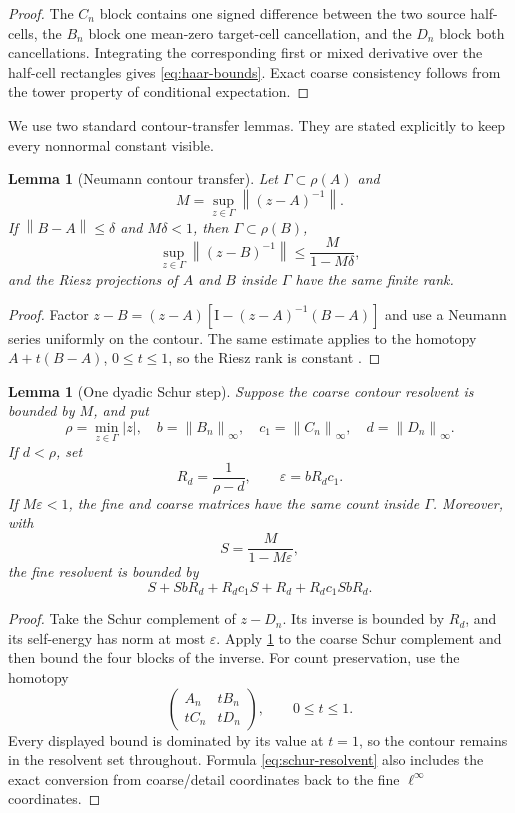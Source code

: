 \documentclass[11pt]{article}
\newtheorem{lemma}[theorem]{Lemma}
\theoremstyle{definition}
\theoremstyle{remark}
\newcommand{\Id}{\mathrm I}
\newcommand{\norm}[1]{\left\lVert #1\right\rVert}
\begin{document}
\begin{proof}
The $C_n$ block contains one signed difference between the two source
half-cells, the $B_n$ block one mean-zero target-cell cancellation, and the
$D_n$ block both cancellations.  Integrating the corresponding first or
mixed derivative over the half-cell rectangles gives
\eqref{eq:haar-bounds}.  Exact coarse consistency follows from the tower
property of conditional expectation.
\end{proof}

We use two standard contour-transfer lemmas.  They are stated explicitly to
keep every nonnormal constant visible.

\begin{lemma}[Neumann contour transfer]
\label{lem:neumann}
Let $\Gamma\subset\rho(A)$ and
\[
 M=\sup_{z\in\Gamma}\norm{(z-A)^{-1}}.
\]
If $\norm{B-A}\le\delta$ and $M\delta<1$, then
$\Gamma\subset\rho(B)$,
\[
 \sup_{z\in\Gamma}\norm{(z-B)^{-1}}
 \le\frac{M}{1-M\delta},
 \label{eq:neumann-resolvent}
\]
and the Riesz projections of $A$ and $B$ inside $\Gamma$ have the same
finite rank.
\end{lemma}

\begin{proof}
Factor $z-B=(z-A)[\Id-(z-A)^{-1}(B-A)]$ and use a Neumann series uniformly
on the contour.  The same estimate applies to the homotopy
$A+t(B-A)$, $0\le t\le1$, so the Riesz rank is constant
\citep{Kato1995}.
\end{proof}

\begin{lemma}[One dyadic Schur step]
\label{lem:schur}
Suppose the coarse contour resolvent is bounded by $M$, and put
\[
 \rho=\min_{z\in\Gamma}|z|,\quad
 b=\norm{B_n}_\infty,\quad
 c_1=\norm{C_n}_\infty,\quad
 d=\norm{D_n}_\infty.
\]
If $d<\rho$, set
\[
 R_d=\frac1{\rho-d},\qquad
 \varepsilon=bR_dc_1.
\]
If $M\varepsilon<1$, the fine and coarse matrices have the same count inside
$\Gamma$.  Moreover, with
\[
 S=\frac{M}{1-M\varepsilon},
\]
the fine resolvent is bounded by
\begin{equation}
 S+SbR_d+R_dc_1S+
 R_d+R_dc_1SbR_d.
 \label{eq:schur-resolvent}
\end{equation}
\end{lemma}

\begin{proof}
Take the Schur complement of $z-D_n$.  Its inverse is bounded by $R_d$,
and its self-energy has norm at most $\varepsilon$.  Apply
\cref{lem:neumann} to the coarse Schur complement and then bound the four
blocks of the inverse.  For count preservation, use the homotopy
\[
 \begin{pmatrix}A_n&tB_n\\tC_n&tD_n\end{pmatrix},
 \qquad0\le t\le1.
\]
Every displayed bound is dominated by its value at $t=1$, so the contour
remains in the resolvent set throughout.  Formula
\eqref{eq:schur-resolvent} also includes the exact conversion from
coarse/detail coordinates back to the fine $\ell^\infty$ coordinates.
\end{proof}
\end{document}
